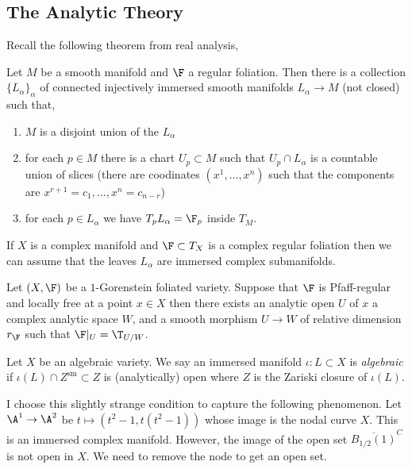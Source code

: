\documentclass[12pt]{article}
\begin{document}
\subsection{The Analytic Theory}

Recall the following theorem from real analysis,

\begin{theorem}[Frobenius]
Let $M$ be a smooth manifold and $\F$ a regular foliation. Then there is a collection $\{ L_\alpha \}_\alpha$ of connected injectively immersed smooth manifolds $L_\alpha \to M$ (not closed) such that,
\begin{enumerate}
\item $M$ is a disjoint union of the $L_\alpha$
\item for each $p \in M$ there is a chart $U_p \subset M$ such that $U_p \cap L_\alpha$ is a countable union of slices (there are coodinates $(x^1, \dots, x^n)$ such that the components are $x^{r+1} = c_1, \dots, x^n = c_{n-r}$)
\item for each $p \in L_\alpha$ we have $T_p L_\alpha = \F_p$ inside $T_M$.
\end{enumerate}
If $X$ is a complex manifold and $\F \subset T_X$ is a complex regular foliation then we can assume that the leaves $L_\alpha$ are immersed complex submanifolds. 
\end{theorem}

\begin{cor}
Let $(X, \F)$ be a $1$-Gorenstein foliated variety. Suppose that $\F$ is Pfaff-regular and locally free at a point $x \in X$ then there exists an analytic open $U$ of $x$ a complex analytic space $W$, and a smooth morphism $U \to W$ of relative dimension $r_{\F}$ such that $\F|_U = \T_{U/W}$. 
\end{cor}

\begin{defn}
Let $X$ be an algebraic variety. 
We say an immersed manifold $\iota : L \subset X$ is \textit{algebraic} if $\iota(L) \cap Z^{\text{sm}} \subset Z$ is (analytically) open where $Z$ is the Zariski closure of $\iota(L)$.
\end{defn}

\begin{rmk}
I choose this slightly strange condition to capture the following phenomenon. Let $\A^1 \to \A^2$ be $t \mapsto (t^2 - 1, t(t^2 - 1))$ whose image is the nodal curve $X$. This is an immersed complex manifold. However, the image of the open set $\overline{B_{1/2}(1)}^C$ is not open in $X$. We need to remove the node to get an open set.
\end{rmk}
\end{document}
